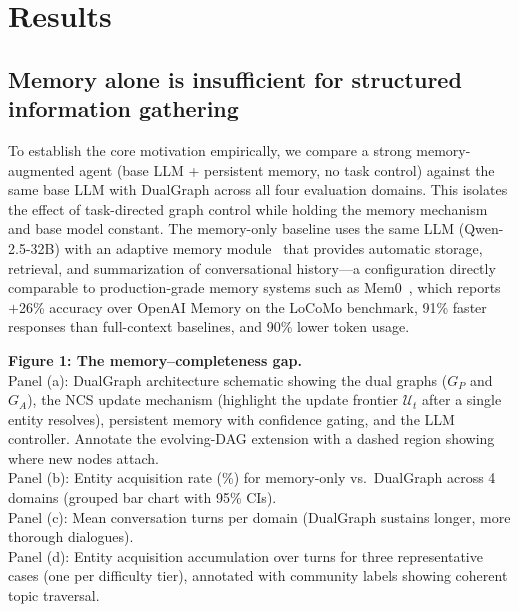 \documentclass[11pt,a4paper]{article}
\newcommand{\placeholder}[1]{%
  \begin{tcolorbox}[colback=yellow!10,colframe=orange!60!black,
    fonttitle=\bfseries,title=Placeholder]
    #1
  \end{tcolorbox}%
}
\begin{document}
\section{Results}
\label{sec:results}


\subsection{Memory alone is insufficient for structured information gathering}
\label{sec:results_memory_gap}

To establish the core motivation empirically, we compare a strong
memory-augmented agent (base LLM + persistent memory, no task control) against
the same base LLM with DualGraph across all four evaluation domains. This
isolates the effect of task-directed graph control while holding the memory
mechanism and base model constant. The memory-only baseline uses the same
LLM (Qwen-2.5-32B) with an adaptive memory module~\cite{amem_2024} that
provides automatic storage, retrieval, and summarization of conversational
history---a configuration directly comparable to production-grade memory
systems such as Mem0~\cite{mem0_2025}, which reports $+$26\% accuracy over
OpenAI Memory on the LoCoMo benchmark, 91\% faster responses than
full-context baselines, and 90\% lower token usage.

\placeholder{%
  \textbf{Figure 1: The memory--completeness gap.}\\
  Panel (a): DualGraph architecture schematic showing the dual graphs
  ($G_P$ and $G_A$), the NCS update mechanism (highlight the update frontier
  $\mathcal{U}_t$ after a single entity resolves), persistent memory with
  confidence gating, and the LLM controller. Annotate the evolving-DAG
  extension with a dashed region showing where new nodes attach.\\
  Panel (b): Entity acquisition rate (\%) for memory-only vs.\ DualGraph
  across 4 domains (grouped bar chart with 95\% CIs).\\
  Panel (c): Mean conversation turns per domain (DualGraph sustains longer,
  more thorough dialogues).\\
  Panel (d): Entity acquisition accumulation over turns for three
  representative cases (one per difficulty tier), annotated with community
  labels showing coherent topic traversal.
}
\end{document}
